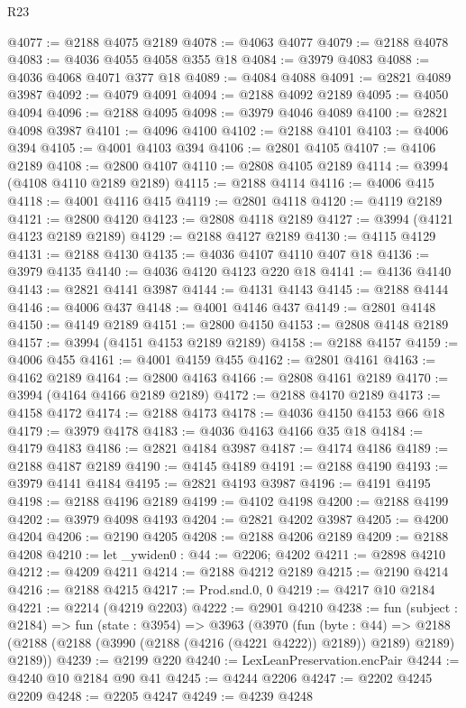\begin{lexlean}{R23}
\begin{coremodule}
@4077 := @2188 @4075 @2189
@4078 := @4063 @4077
@4079 := @2188 @4078
@4083 := @4036 @4055 @4058 @355 @18
@4084 := @3979 @4083
@4088 := @4036 @4068 @4071 @377 @18
@4089 := @4084 @4088
@4091 := @2821 @4089 @3987
@4092 := @4079 @4091
@4094 := @2188 @4092 @2189
@4095 := @4050 @4094
@4096 := @2188 @4095
@4098 := @3979 @4046 @4089
@4100 := @2821 @4098 @3987
@4101 := @4096 @4100
@4102 := @2188 @4101
@4103 := @4006 @394
@4105 := @4001 @4103 @394
@4106 := @2801 @4105
@4107 := @4106 @2189
@4108 := @2800 @4107
@4110 := @2808 @4105 @2189
@4114 := @3994 (@4108 @4110 @2189 @2189)
@4115 := @2188 @4114
@4116 := @4006 @415
@4118 := @4001 @4116 @415
@4119 := @2801 @4118
@4120 := @4119 @2189
@4121 := @2800 @4120
@4123 := @2808 @4118 @2189
@4127 := @3994 (@4121 @4123 @2189 @2189)
@4129 := @2188 @4127 @2189
@4130 := @4115 @4129
@4131 := @2188 @4130
@4135 := @4036 @4107 @4110 @407 @18
@4136 := @3979 @4135
@4140 := @4036 @4120 @4123 @220 @18
@4141 := @4136 @4140
@4143 := @2821 @4141 @3987
@4144 := @4131 @4143
@4145 := @2188 @4144
@4146 := @4006 @437
@4148 := @4001 @4146 @437
@4149 := @2801 @4148
@4150 := @4149 @2189
@4151 := @2800 @4150
@4153 := @2808 @4148 @2189
@4157 := @3994 (@4151 @4153 @2189 @2189)
@4158 := @2188 @4157
@4159 := @4006 @455
@4161 := @4001 @4159 @455
@4162 := @2801 @4161
@4163 := @4162 @2189
@4164 := @2800 @4163
@4166 := @2808 @4161 @2189
@4170 := @3994 (@4164 @4166 @2189 @2189)
@4172 := @2188 @4170 @2189
@4173 := @4158 @4172
@4174 := @2188 @4173
@4178 := @4036 @4150 @4153 @66 @18
@4179 := @3979 @4178
@4183 := @4036 @4163 @4166 @35 @18
@4184 := @4179 @4183
@4186 := @2821 @4184 @3987
@4187 := @4174 @4186
@4189 := @2188 @4187 @2189
@4190 := @4145 @4189
@4191 := @2188 @4190
@4193 := @3979 @4141 @4184
@4195 := @2821 @4193 @3987
@4196 := @4191 @4195
@4198 := @2188 @4196 @2189
@4199 := @4102 @4198
@4200 := @2188 @4199
@4202 := @3979 @4098 @4193
@4204 := @2821 @4202 @3987
@4205 := @4200 @4204
@4206 := @2190 @4205
@4208 := @2188 @4206 @2189
@4209 := @2188 @4208
@4210 := let _ywiden0 : @44 := @2206; @4202
@4211 := @2898 @4210
@4212 := @4209 @4211
@4214 := @2188 @4212 @2189
@4215 := @2190 @4214
@4216 := @2188 @4215
@4217 := Prod.snd.{0, 0}
@4219 := @4217 @10 @2184
@4221 := @2214 (@4219 @2203)
@4222 := @2901 @4210
@4238 := fun (subject : @2184) =>
  fun (state : @3954) =>
  @3963
    (@3970
      (fun (byte : @44) =>
      @2188 (@2188 (@2188 (@3990 (@2188 (@4216 (@4221 @4222)) @2189)) @2189) @2189) @2189))
@4239 := @2199 @220
@4240 := LexLeanPreservation.encPair
@4244 := @4240 @10 @2184 @90 @41
@4245 := @4244 @2206
@4247 := @2202 @4245 @2209
@4248 := @2205 @4247
@4249 := @4239 @4248

\end{coremodule}
\end{lexlean}
